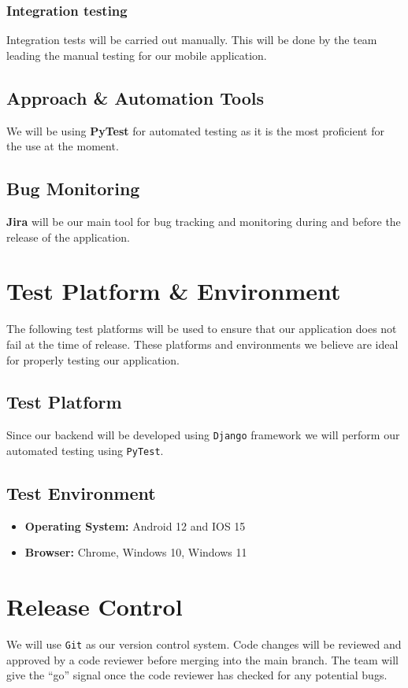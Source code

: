 \documentclass[title page]{article}
\begin{document}
\subsubsection{Integration testing}
Integration tests will be carried out manually. This will be done by the team leading the manual testing for our mobile application. 

\subsection{Approach \& Automation Tools}
We will be using \textbf{PyTest} for automated testing as it is the most proficient for the use at the moment. 


\subsection{Bug Monitoring}
\textbf{Jira} will be our main tool for bug tracking and monitoring during and before the release of the application. 


\section{Test Platform \& Environment}
The following test platforms will be used to ensure that our application does not fail at the time of release. These platforms and environments we believe are ideal for properly testing our application. 

\subsection{Test Platform}
Since our backend will be developed using \texttt{Django} framework we will perform our automated testing using \texttt{PyTest}.

\subsection{Test Environment}
\begin{itemize}
    \item \textbf{Operating System:} Android 12 and IOS 15
    \item \textbf{Browser:} Chrome, Windows 10, Windows 11
\end{itemize}

\section{Release Control}
We will use \texttt{Git} as our version control system. Code changes will be reviewed and approved by a code reviewer before merging into the main branch. The team will give the ``go'' signal once the code reviewer has checked for any potential bugs. 
\end{document}
